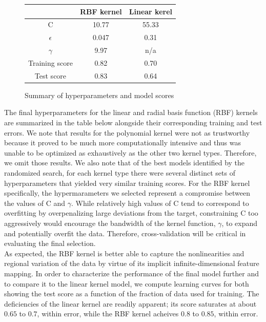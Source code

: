 \documentclass[12]{article}
\begin{document}
\begin{figure}[H]
\centering
\begin{tabular}{ |c|c|c| } 
 \hline
       & \textbf{RBF kernel} & \textbf{Linear kerel} \\ 
 \hline
 C              & 10.77 & 55.33 \\ 
 $\epsilon$     & 0.047 & 0.31 \\
 $\gamma$       & 9.97 & n/a \\
 Training score & 0.82 & 0.70 \\
 Test score     & 0.83 & 0.64 \\
 \hline
\end{tabular}
\caption{\label{fig:Results}Summary of hyperparameters and model scores}
\end{figure}

\noindent The final hyperparameters for the linear and radial basis function (RBF) kernels are summarized in the table below alongside their corresponding training and test errors. We note that results for the polynomial kernel were not as trustworthy because it proved to be much more computationally intensive and thus was unable to be optimized as exhaustively as the other two kernel types. Therefore, we omit those results. We also note that of the best models identified by the randomized search, for each kernel type there were several distinct sets of hyperparameters that yielded very similar training scores. For the RBF kernel specifically, the hypermarameters we selected represent a compromise between the values of C and $\gamma$. While relatively high values of C tend to correspond to overfitting by overpenalizing large deviations from the target, constraining C too aggressively would encourage the bandwidth of the kernel function, $\gamma$, to expand and potentially overfit the data. Therefore, cross-validation will be critical in evaluating the final selection.\\  

\noindent As expected, the RBF kernel is better able to capture the nonlinearities and regional variation of the data by virtue of its implicit infinite-dimensional feature mapping. In order to characterize the performance of the final model further and to compare it to the linear kernel model, we compute learning curves for both showing the test score as a function of the fraction of data used for training. The deficiencies of the linear kernel are readily apparent; its score saturates at about $0.65$ to $0.7$, within error, while the RBF kernel acheives $0.8$ to $0.85$, within error. 
\end{document}
